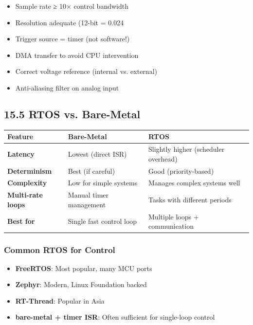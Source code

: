 \documentclass[11pt,a4paper]{book}
\begin{document}
\begin{itemize}
\begin{itemize}
\item [ ] Sample rate ≥ 10× control bandwidth
\item [ ] Resolution adequate (12-bit = 0.024%
\item [ ] Trigger source = timer (not software!)
\item [ ] DMA transfer to avoid CPU intervention
\item [ ] Correct voltage reference (internal vs. external)
\item [ ] Anti-aliasing filter on analog input
\end{itemize}

\medskip\noindent\hrulefill\medskip

\subsection{15.5 RTOS vs. Bare-Metal}

\begin{center}
\begin{tabular}{|l|l|l|}
\hline
Feature & Bare-Metal & RTOS \\
\hline
\textbf{Latency} & Lowest (direct ISR) & Slightly higher (scheduler overhead) \\
\textbf{Determinism} & Best (if careful) & Good (priority-based) \\
\textbf{Complexity} & Low for simple systems & Manages complex systems well \\
\textbf{Multi-rate loops} & Manual timer management & Tasks with different periods \\
\textbf{Best for} & Single fast control loop & Multiple loops + communication \\
\hline
\end{tabular}
\end{center}

\subsubsection{Common RTOS for Control}

\begin{itemize}
\item \textbf{FreeRTOS}: Most popular, many MCU ports
\item \textbf{Zephyr}: Modern, Linux Foundation backed
\item \textbf{RT-Thread}: Popular in Asia
\item \textbf{bare-metal + timer ISR}: Often sufficient for single-loop control
\end{itemize}


\end{itemize}
\end{document}

